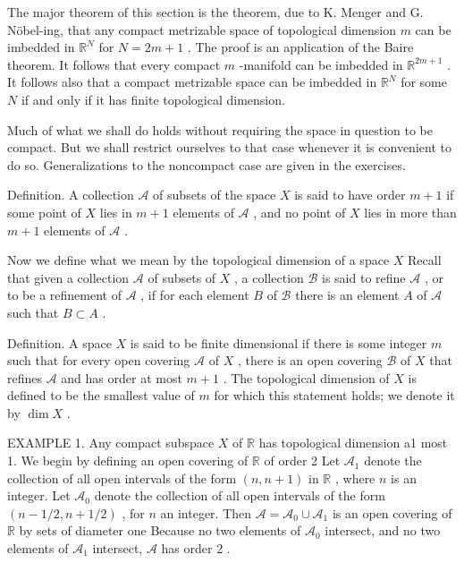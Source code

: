 \documentclass[10pt]{article}
\begin{document}
The major theorem of this section is the theorem, due to K. Menger and G. Nöbel-ing, that any compact metrizable space of topological dimension \(m\) can be imbedded in \({\mathbb{R}}^{N}\) for \(N = {2m} + 1\) . The proof is an application of the Baire theorem. It follows that every compact \(m\) -manifold can be imbedded in \({\mathbb{R}}^{{2m} + 1}\) . It follows also that a compact metrizable space can be imbedded in \({\mathbb{R}}^{N}\) for some \(N\) if and only if it has finite topological dimension.

Much of what we shall do holds without requiring the space in question to be compact. But we shall restrict ourselves to that case whenever it is convenient to do so. Generalizations to the noncompact case are given in the exercises.

Definition. A collection \(\mathcal{A}\) of subsets of the space \(X\) is said to have order \(m + 1\) if some point of \(X\) lies in \(m + 1\) elements of \(\mathcal{A}\) , and no point of \(X\) lies in more than \(m + 1\) elements of \(\mathcal{A}\) .

Now we define what we mean by the topological dimension of a space \(X\) Recall that given a collection \(\mathcal{A}\) of subsets of \(X\) , a collection \(\mathcal{B}\) is said to refine \(\mathcal{A}\) , or to be a refinement of \(\mathcal{A}\) , if for each element \(B\) of \(\mathcal{B}\) there is an element \(A\) of \(\mathcal{A}\) such that \(B \subset  A\) .

Definition. A space \(X\) is said to be finite dimensional if there is some integer \(m\) such that for every open covering \(\mathcal{A}\) of \(X\) , there is an open covering \(\mathcal{B}\) of \(X\) that refines \(\mathcal{A}\) and has order at most \(m + 1\) . The topological dimension of \(X\) is defined to be the smallest value of \(m\) for which this statement holds; we denote it by \(\dim X\) .

EXAMPLE 1. Any compact subspace \(X\) of \(\mathbb{R}\) has topological dimension a1 most 1. We begin by defining an open covering of \(\mathbb{R}\) of order 2 Let \({\mathcal{A}}_{1}\) denote the collection of all open intervals of the form \(\left( {n,n + 1}\right)\) in \(\mathbb{R}\) , where \(n\) is an integer. Let \({\mathcal{A}}_{0}\) denote the collection of all open intervals of the form \(\left( {n - 1/2,n + 1/2}\right)\) , for \(n\) an integer. Then \(\mathcal{A} = {\mathcal{A}}_{0} \cup  {\mathcal{A}}_{1}\) is an open covering of \(\mathbb{R}\) by sets of diameter one Because no two elements of \({\mathcal{A}}_{0}\) intersect, and no two elements of \({\mathcal{A}}_{1}\) intersect, \(\mathcal{A}\) has order 2 .
\end{document}
